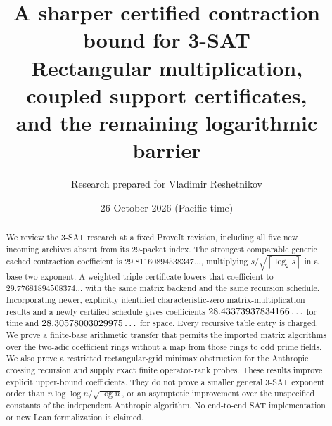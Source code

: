 \documentclass[11pt]{article}
\title{\color{ink}A sharper certified contraction bound for 3-SAT\\[4pt]
\large Rectangular multiplication, coupled support certificates,\\
and the remaining logarithmic barrier}
\author{Research prepared for Vladimir Reshetnikov}
\date{26 October 2026 (Pacific time)}
\numberwithin{equation}{section}
\theoremstyle{definition}\newtheorem{definition}[theorem]{Definition}
\theoremstyle{remark}\newtheorem{remark}[theorem]{Remark}
\newcommand{\ceil}[1]{\left\lceil#1\right\rceil}
\newcommand{\oldC}{29.81160894538347\ldots}
\newcommand{\sameC}{29.77681894508374\ldots}
\begin{document}
\maketitle
\begin{abstract}
We review the 3-SAT research at a fixed ProveIt revision, including all five
new incoming archives absent from its 29-packet index. The strongest
comparable generic cached contraction coefficient is $\oldC$, multiplying
$s/\sqrt{\ceil{\log_2s}}$ in a base-two exponent. A weighted triple
certificate lowers that coefficient to $\sameC$ with the same matrix
backend and the same recursion schedule. Incorporating newer, explicitly
identified characteristic-zero matrix-multiplication results and a newly
certified schedule gives coefficients $28.43373937834166\ldots$ for time and $28.30578003029975\ldots$ for
space. Every recursive table entry is charged. We prove a finite-base
arithmetic transfer that permits the imported matrix algorithms over the
two-adic coefficient rings without a map from those rings to odd prime
fields. We also prove a restricted rectangular-grid minimax obstruction
for the Anthropic crossing recursion and supply exact finite operator-rank
probes. These results improve explicit upper-bound coefficients. They do
not prove a smaller general 3-SAT exponent order than
$n\log\log n/\sqrt{\log n}$, or an asymptotic improvement over the
unspecified constants of the independent Anthropic algorithm. No
end-to-end SAT implementation or new Lean formalization is claimed.
\end{abstract}
\tableofcontents
\clearpage








\appendix


\end{document}
